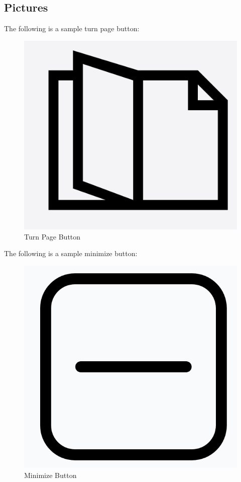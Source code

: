 \documentclass[12pt, titlepage]{article}
\begin{document}
\newpage

\subsection{Pictures}
The following is a sample turn page button:
\begin{figure}[H]
    \centering
    \includegraphics[scale = 0.5]{VnV_Pictures/turn_page.png}
    \caption{Turn Page Button}
\end{figure}

\noindent The following is a sample minimize button:
\begin{figure}[H]
    \centering
    \includegraphics[scale = 0.5]{VnV_Pictures/min_icon.png}
    \caption{Minimize Button}
\end{figure}
\end{document}
